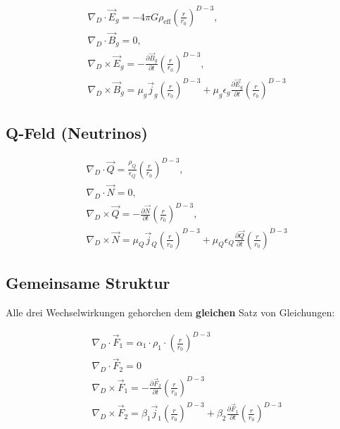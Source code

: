 \documentclass[12pt,a4paper]{article}
\begin{document}
\[
\begin{aligned}
&\nabla_D \cdot \vec{E}_g = -4\pi G \rho_{\text{eff}} \left( \frac{r}{r_0} \right)^{D-3}, \\
&\nabla_D \cdot \vec{B}_g = 0, \\
&\nabla_D \times \vec{E}_g = -\frac{\partial \vec{B}_g}{\partial t} \left( \frac{r}{r_0} \right)^{D-3}, \\
&\nabla_D \times \vec{B}_g = \mu_g \vec{j}_g \left( \frac{r}{r_0} \right)^{D-3} + \mu_g \epsilon_g \frac{\partial \vec{E}_g}{\partial t} \left( \frac{r}{r_0} \right)^{D-3}
\end{aligned}
\]

\subsection*{Q-Feld (Neutrinos)}

\[
\begin{aligned}
&\nabla_D \cdot \vec{Q} = \frac{\rho_Q}{\epsilon_Q} \left( \frac{r}{r_0} \right)^{D-3}, \\
&\nabla_D \cdot \vec{N} = 0, \\
&\nabla_D \times \vec{Q} = -\frac{\partial \vec{N}}{\partial t} \left( \frac{r}{r_0} \right)^{D-3}, \\
&\nabla_D \times \vec{N} = \mu_Q \vec{j}_Q \left( \frac{r}{r_0} \right)^{D-3} + \mu_Q \epsilon_Q \frac{\partial \vec{Q}}{\partial t} \left( \frac{r}{r_0} \right)^{D-3}
\end{aligned}
\]

\subsection*{Gemeinsame Struktur}

Alle drei Wechselwirkungen gehorchen dem \textbf{gleichen} Satz von Gleichungen:

\[
\boxed{
\begin{aligned}
&\nabla_D \cdot \vec{F}_1 = \alpha_1 \cdot \rho_1 \cdot \left( \frac{r}{r_0} \right)^{D-3} \\
&\nabla_D \cdot \vec{F}_2 = 0 \\
&\nabla_D \times \vec{F}_1 = -\frac{\partial \vec{F}_2}{\partial t} \left( \frac{r}{r_0} \right)^{D-3} \\
&\nabla_D \times \vec{F}_2 = \beta_1 \vec{j}_1 \left( \frac{r}{r_0} \right)^{D-3} + \beta_2 \frac{\partial \vec{F}_1}{\partial t} \left( \frac{r}{r_0} \right)^{D-3}
\end{aligned}
}
\]
\end{document}
